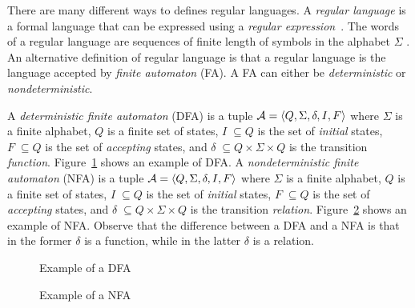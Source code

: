There are many different ways to defines regular languages.
A \emph{regular language} is a formal language that can be expressed using a
\emph{regular expression}~\cite{hopcroft2013introduction}.
The words of a regular language are sequences of finite length of symbols
in the alphabet $\Sigma$ .
An alternative definition of regular language is that a
regular language is the language accepted by \emph{finite automaton} (FA).
A FA can either be \emph{deterministic} or \emph{nondeterministic}.

A \emph{deterministic finite automaton} (DFA) is a tuple
$\mathcal{A}=\langle Q, \Sigma, \delta, I, F\rangle$ where $\Sigma$ is a finite alphabet, $Q$ is a finite set of states,
$I \; \subseteq Q$ is the set of \emph{initial} states, $F \; \subseteq Q$ is
the set of \emph{accepting}  states, and $\delta \; \subseteq Q \times \Sigma \times Q$
is the transition \emph{function}.
Figure~\ref{fig:DFA-example-1} shows an example of DFA.
A \emph{nondeterministic finite automaton} (NFA) is a tuple
$\mathcal{A}=\langle Q, \Sigma, \delta, I, F\rangle$ where $\Sigma$ is a finite alphabet, $Q$ is a finite set of states,
$I \; \subseteq Q$ is the set of \emph{initial} states, $F \; \subseteq Q$ is
the set of \emph{accepting}  states, and $\delta \; \subseteq Q \times \Sigma \times Q$
is the transition \emph{relation}.
Figure~\ref{fig:NFA-example-1} shows an example of NFA.
Observe that the difference between a DFA and a NFA is that in the former
$\delta$ is a function, while in the latter $\delta$ is a relation.

\begin{figure}[h]
\centering
{}
\caption{Example of a DFA}
\label{fig:DFA-example-1}
\end{figure}

\begin{figure}[h]
\centering
{}
\caption{Example of a NFA}
\label{fig:NFA-example-1}
\end{figure}

